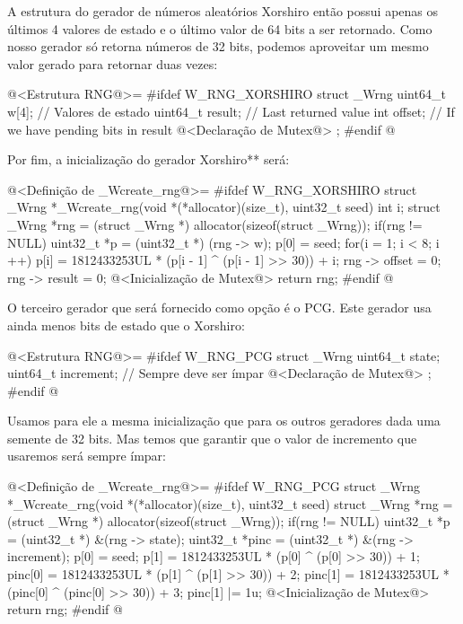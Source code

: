 A estrutura do gerador de números aleatórios Xorshiro então possui
apenas os últimos 4 valores de estado e o último valor de 64 bits a
ser retornado. Como nosso gerador só retorna números de 32 bits,
podemos aproveitar um mesmo valor gerado para retornar duas vezes:

\iniciocodigo
@<Estrutura RNG@>=
#ifdef W_RNG_XORSHIRO
struct _Wrng{
  uint64_t w[4];        // Valores de estado
  uint64_t result; // Last returned value
  int offset;      // If we have pending bits in result 
  @<Declaração de Mutex@>
};
#endif
@
\fimcodigo

Por fim, a inicialização do gerador Xorshiro** será:

\iniciocodigo
@<Definição de \_Wcreate\_rng@>=
#ifdef W_RNG_XORSHIRO
struct _Wrng *_Wcreate_rng(void *(*allocator)(size_t), uint32_t seed){
  int i;
  struct _Wrng *rng = (struct _Wrng *) allocator(sizeof(struct _Wrng));
  if(rng != NULL){
    uint32_t *p = (uint32_t *) (rng -> w);
    p[0] = seed;
    for(i = 1; i < 8; i ++)
      p[i] = 1812433253UL * (p[i - 1] ^ (p[i - 1] >> 30)) + i;
    rng -> offset = 0;
    rng -> result = 0;
    @<Inicialização de Mutex@>
  }
  return rng;
}
#endif
@
\fimcodigo


O terceiro gerador que será fornecido como opção é o PCG. Este gerador
usa ainda menos bits de estado que o Xorshiro:

\iniciocodigo
@<Estrutura RNG@>=
#ifdef W_RNG_PCG
struct _Wrng{
  uint64_t state;
  uint64_t increment; // Sempre deve ser ímpar
  @<Declaração de Mutex@>
};
#endif
@
\fimcodigo

Usamos para ele a mesma inicialização que para os outros geradores
dada uma semente de 32 bits. Mas temos que garantir que o valor de
incremento que usaremos será sempre ímpar:

\iniciocodigo
@<Definição de \_Wcreate\_rng@>=
#ifdef W_RNG_PCG
struct _Wrng *_Wcreate_rng(void *(*allocator)(size_t), uint32_t seed){
  struct _Wrng *rng = (struct _Wrng *) allocator(sizeof(struct _Wrng));
  if(rng != NULL){
    uint32_t *p = (uint32_t *) &(rng -> state);
    uint32_t *pinc = (uint32_t *) &(rng -> increment);
    p[0] = seed;
    p[1] = 1812433253UL * (p[0] ^ (p[0] >> 30)) + 1;
    pinc[0] = 1812433253UL * (p[1] ^ (p[1] >> 30)) + 2;
    pinc[1] = 1812433253UL * (pinc[0] ^ (pinc[0] >> 30)) + 3;
    pinc[1] |= 1u;
    @<Inicialização de Mutex@>
  }
  return rng;
}
#endif
@
\fimcodigo

